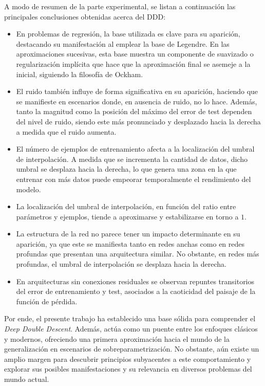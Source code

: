 A modo de resumen de la parte experimental, se listan a continuación las principales conclusiones obtenidas acerca del DDD:
\begin{itemize}
    \item En problemas de regresión, la base utilizada es clave para su aparición, destacando su manifestación al emplear la base de Legendre. En las aproximaciones sucesivas, esta base muestra un componente de suavizado o regularización implícita que hace que la aproximación final se asemeje a la inicial, siguiendo la filosofía de Ockham.

    \item El ruido también influye de forma significativa en su aparición, haciendo que se manifieste en escenarios donde, en ausencia de ruido, no lo hace. Además, tanto la magnitud como la posición del máximo del error de test dependen del nivel de ruido, siendo este más pronunciado y desplazado hacia la derecha a medida que el ruido aumenta.
    
    \item El número de ejemplos de entrenamiento afecta a la localización del umbral de interpolación. A medida que se incrementa la cantidad de datos, dicho umbral se desplaza hacia la derecha, lo que genera una zona en la que entrenar con más datos puede empeorar temporalmente el rendimiento del modelo.
    
    \item La localización del umbral de interpolación, en función del ratio entre parámetros y ejemplos, tiende a aproximarse y estabilizarse en torno a $1$.
    
    \item La estructura de la red no parece tener un impacto determinante en su aparición, ya que este se manifiesta tanto en redes anchas como en redes profundas que presentan una arquitectura similar. No obstante, en redes más profundas, el umbral de interpolación se desplaza hacia la derecha.
    
    \item En arquitecturas sin conexiones residuales se observan repuntes transitorios del error de entrenamiento y test, asociados a la caoticidad del paisaje de la función de pérdida.
\end{itemize}

Por ende, el presente trabajo ha establecido una base sólida para comprender el \textit{Deep Double Descent}. Además, actúa como un puente entre los enfoques clásicos y modernos, ofreciendo una primera aproximación hacia el mundo de la generalización en escenarios de sobreparametrización. No obstante, aún existe un amplio margen para descubrir principios subyacentes a este comportamiento y explorar sus posibles manifestaciones y su relevancia en diversos problemas del mundo actual.

